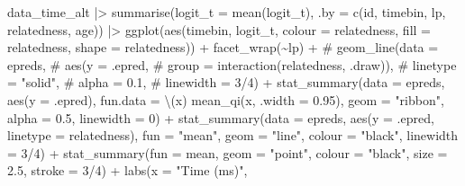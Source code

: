 \documentclass[
  letterpaper,
  DIV=11,
  numbers=noendperiod]{scrartcl}
\newenvironment{Shaded}{\begin{snugshade}}{\end{snugshade}}
\newcommand{\AttributeTok}[1]{\textcolor[rgb]{0.40,0.45,0.13}{#1}}
\newcommand{\CommentTok}[1]{\textcolor[rgb]{0.37,0.37,0.37}{#1}}
\newcommand{\DecValTok}[1]{\textcolor[rgb]{0.68,0.00,0.00}{#1}}
\newcommand{\FloatTok}[1]{\textcolor[rgb]{0.68,0.00,0.00}{#1}}
\newcommand{\FunctionTok}[1]{\textcolor[rgb]{0.28,0.35,0.67}{#1}}
\newcommand{\NormalTok}[1]{\textcolor[rgb]{0.00,0.23,0.31}{#1}}
\newcommand{\SpecialCharTok}[1]{\textcolor[rgb]{0.37,0.37,0.37}{#1}}
\newcommand{\StringTok}[1]{\textcolor[rgb]{0.13,0.47,0.30}{#1}}
\begin{document}
\begin{Shaded}
\begin{Highlighting}[]
\NormalTok{data\_time\_alt }\SpecialCharTok{|\textgreater{}} 
    \FunctionTok{summarise}\NormalTok{(}\AttributeTok{logit\_t =} \FunctionTok{mean}\NormalTok{(logit\_t),}
              \AttributeTok{.by =} \FunctionTok{c}\NormalTok{(id, timebin, lp, relatedness, age)) }\SpecialCharTok{|\textgreater{}} 
    \FunctionTok{ggplot}\NormalTok{(}\FunctionTok{aes}\NormalTok{(timebin, logit\_t, }
               \AttributeTok{colour =}\NormalTok{ relatedness,}
               \AttributeTok{fill =}\NormalTok{ relatedness,}
               \AttributeTok{shape =}\NormalTok{ relatedness)) }\SpecialCharTok{+}
    \FunctionTok{facet\_wrap}\NormalTok{(}\SpecialCharTok{\textasciitilde{}}\NormalTok{lp) }\SpecialCharTok{+}
    \CommentTok{\# geom\_line(data = epreds,}
    \CommentTok{\#         aes(y = .epred,}
    \CommentTok{\#           group = interaction(relatedness, .draw)),}
    \CommentTok{\#         linetype = "solid",}
    \CommentTok{\#         alpha = 0.1,}
    \CommentTok{\#         linewidth = 3/4) +}
    \FunctionTok{stat\_summary}\NormalTok{(}\AttributeTok{data =}\NormalTok{ epreds,}
                 \FunctionTok{aes}\NormalTok{(}\AttributeTok{y =}\NormalTok{ .epred),}
                 \AttributeTok{fun.data =}\NormalTok{ \textbackslash{}(x) }\FunctionTok{mean\_qi}\NormalTok{(x, }\AttributeTok{.width =} \FloatTok{0.95}\NormalTok{),}
                 \AttributeTok{geom =} \StringTok{"ribbon"}\NormalTok{,}
                 \AttributeTok{alpha =} \FloatTok{0.5}\NormalTok{,}
                 \AttributeTok{linewidth =} \DecValTok{0}\NormalTok{) }\SpecialCharTok{+}
    \FunctionTok{stat\_summary}\NormalTok{(}\AttributeTok{data =}\NormalTok{ epreds,}
                 \FunctionTok{aes}\NormalTok{(}\AttributeTok{y =}\NormalTok{ .epred,}
                    \AttributeTok{linetype =}\NormalTok{ relatedness),}
                 \AttributeTok{fun =} \StringTok{"mean"}\NormalTok{,}
                 \AttributeTok{geom =} \StringTok{"line"}\NormalTok{,}
                 \AttributeTok{colour =} \StringTok{"black"}\NormalTok{,}
                 \AttributeTok{linewidth =} \DecValTok{3}\SpecialCharTok{/}\DecValTok{4}\NormalTok{) }\SpecialCharTok{+}
    \FunctionTok{stat\_summary}\NormalTok{(}\AttributeTok{fun =}\NormalTok{ mean,}
                 \AttributeTok{geom =} \StringTok{"point"}\NormalTok{,}
                 \AttributeTok{colour =} \StringTok{"black"}\NormalTok{,}
                 \AttributeTok{size =} \FloatTok{2.5}\NormalTok{,}
                 \AttributeTok{stroke =} \DecValTok{3}\SpecialCharTok{/}\DecValTok{4}\NormalTok{) }\SpecialCharTok{+}
    \FunctionTok{labs}\NormalTok{(}\AttributeTok{x =} \StringTok{"Time (ms)"}\NormalTok{,}

\end{Highlighting}
\end{Shaded}
\end{document}
